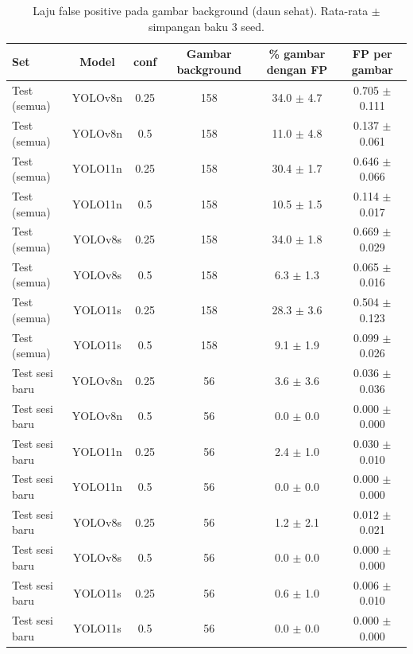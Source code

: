 \begin{table}[!t]
\centering
\caption{Laju false positive pada gambar background (daun sehat). Rata-rata $\pm$ simpangan baku 3 seed.}
\label{tab:fp_background}
\footnotesize
\begin{tabular}{lccccc}
\hline
\textbf{Set} & \textbf{Model} & \textbf{conf} & \textbf{Gambar background} & \textbf{\% gambar dengan FP} & \textbf{FP per gambar} \\
\hline
Test (semua) & YOLOv8n & 0.25 & 158 & 34.0 $\pm$ 4.7 & 0.705 $\pm$ 0.111 \\
Test (semua) & YOLOv8n & 0.5 & 158 & 11.0 $\pm$ 4.8 & 0.137 $\pm$ 0.061 \\
Test (semua) & YOLO11n & 0.25 & 158 & 30.4 $\pm$ 1.7 & 0.646 $\pm$ 0.066 \\
Test (semua) & YOLO11n & 0.5 & 158 & 10.5 $\pm$ 1.5 & 0.114 $\pm$ 0.017 \\
Test (semua) & YOLOv8s & 0.25 & 158 & 34.0 $\pm$ 1.8 & 0.669 $\pm$ 0.029 \\
Test (semua) & YOLOv8s & 0.5 & 158 & 6.3 $\pm$ 1.3 & 0.065 $\pm$ 0.016 \\
Test (semua) & YOLO11s & 0.25 & 158 & 28.3 $\pm$ 3.6 & 0.504 $\pm$ 0.123 \\
Test (semua) & YOLO11s & 0.5 & 158 & 9.1 $\pm$ 1.9 & 0.099 $\pm$ 0.026 \\
Test sesi baru & YOLOv8n & 0.25 & 56 & 3.6 $\pm$ 3.6 & 0.036 $\pm$ 0.036 \\
Test sesi baru & YOLOv8n & 0.5 & 56 & 0.0 $\pm$ 0.0 & 0.000 $\pm$ 0.000 \\
Test sesi baru & YOLO11n & 0.25 & 56 & 2.4 $\pm$ 1.0 & 0.030 $\pm$ 0.010 \\
Test sesi baru & YOLO11n & 0.5 & 56 & 0.0 $\pm$ 0.0 & 0.000 $\pm$ 0.000 \\
Test sesi baru & YOLOv8s & 0.25 & 56 & 1.2 $\pm$ 2.1 & 0.012 $\pm$ 0.021 \\
Test sesi baru & YOLOv8s & 0.5 & 56 & 0.0 $\pm$ 0.0 & 0.000 $\pm$ 0.000 \\
Test sesi baru & YOLO11s & 0.25 & 56 & 0.6 $\pm$ 1.0 & 0.006 $\pm$ 0.010 \\
Test sesi baru & YOLO11s & 0.5 & 56 & 0.0 $\pm$ 0.0 & 0.000 $\pm$ 0.000 \\
\hline
\end{tabular}
\end{table}
